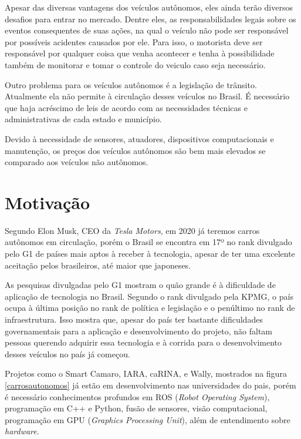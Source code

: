 Apesar das diversas vantagens dos veículos autônomos, eles ainda terão diversos desafios para entrar no mercado. Dentre eles, as responsabilidades legais sobre os eventos consequentes de suas ações, na qual o veículo não pode ser responsável por possíveis acidentes causados por ele. Para isso, o motorista deve ser responsável por qualquer coisa que venha acontecer e tenha à possibilidade também de monitorar e tomar o controle do veiculo caso seja necessário. \cite{inproceedings}

Outro problema para os veículos autônomos é a legislação de trânsito. Atualmente ela não permite à circulação desses veículos no Brasil. É necessário que haja acréscimo de leis de acordo com as necessidades técnicas e administrativas de cada estado e município.\cite{inproceedings}

Devido à necessidade de sensores, atuadores, dispositivos computacionais e manutenção, os preços dos veículos autônomos são bem mais elevados se comparado aos veículos não autônomos. \cite{inproceedings}

\section{Motivação}
\label{sec:motivacao}

Segundo Elon Musk, CEO da \textit{Tesla Motors}, em 2020 já teremos carros autônomos em circulação\cite{elonmusk}, porém o Brasil se encontra em 17º no rank divulgado pelo G1\cite{brasilutimorank} de países mais aptos à receber à tecnologia, apesar de ter uma excelente aceitação pelos brasileiros, até maior que japoneses. 

As pesquisas divulgadas pelo G1 mostram o quão grande é à dificuldade de aplicação de tecnologia no Brasil. Segundo o rank divulgado pela KPMG, o país ocupa à última posição no rank de política e legislação e o penúltimo no rank de infraestrutura. Isso mostra que, apesar do país ter bastante dificuldades governamentais para a aplicação e desenvolvimento do projeto, não faltam pessoas querendo adquirir essa tecnologia e à corrida para o desenvolvimento desses veículos no país já começou. 

Projetos como o Smart Camaro, IARA, caRINA, e Wally, mostrados na figura \ref{carrosautonomos} \cite{carroautonomobrasil} já estão em desenvolvimento nas universidades do pais, porém é necessário conhecimentos profundos em ROS (\textit{Robot Operating System}), programação em C++ e Python, fusão de sensores, visão computacional, programação em GPU (\textit{Graphics Processing Unit}), além de entendimento sobre \textit{hardware}.


